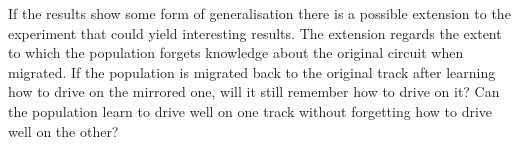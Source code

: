 If the results show some form of generalisation there is a possible extension to the experiment that could yield interesting results. The extension regards the extent to which the population forgets knowledge about the original circuit when migrated. If the population is migrated back to the original track after learning how to drive on the mirrored one, will it still remember how to drive on it? Can the population learn to drive well on one track without forgetting how to drive well on the other?


